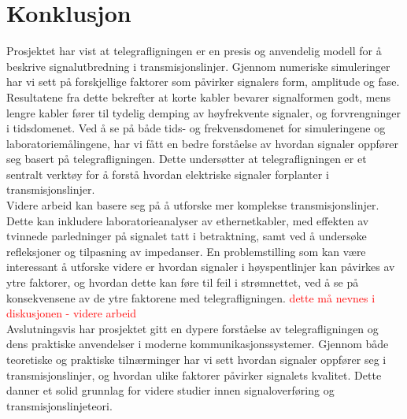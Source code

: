 \section{Konklusjon}
Prosjektet har vist at telegrafligningen er en presis og anvendelig modell for å beskrive signalutbredning i transmisjonslinjer. Gjennom numeriske simuleringer har vi sett på forskjellige faktorer som påvirker signalers form, amplitude og fase. Resultatene fra dette bekrefter at korte kabler bevarer signalformen godt, mens lengre kabler fører til tydelig demping av høyfrekvente signaler, og forvrengninger i tidsdomenet. Ved å se på både tids- og frekvensdomenet for simuleringene og laboratoriemålingene, har vi fått en bedre forståelse av hvordan signaler oppfører seg basert på telegrafligningen. Dette undersøtter at telegrafligningen er et sentralt verktøy for å forstå hvordan elektriske signaler forplanter i transmisjonslinjer.
\\[1em]
Videre arbeid kan basere seg på å utforske mer komplekse transmisjonslinjer. Dette kan inkludere laboratorieanalyser av ethernetkabler, med effekten av tvinnede parledninger på signalet tatt i betraktning, samt ved å undersøke refleksjoner og tilpasning av impedanser. En problemstilling som kan være interessant å utforske videre er hvordan signaler i høyspentlinjer kan påvirkes av ytre faktorer, og hvordan dette kan føre til feil i strømnettet, ved å se på konsekvensene av de ytre faktorene med telegrafligningen. \textcolor{red}{dette må nevnes i diskusjonen - videre arbeid}
\\[1em]
Avslutningsvis har prosjektet gitt en dypere forståelse av telegrafligningen og dens praktiske anvendelser i moderne kommunikasjonssystemer. Gjennom både teoretiske og praktiske tilnærminger har vi sett hvordan signaler oppfører seg i transmisjonslinjer, og hvordan ulike faktorer påvirker signalets kvalitet. Dette danner et solid grunnlag for videre studier innen signaloverføring og transmisjonslinjeteori.